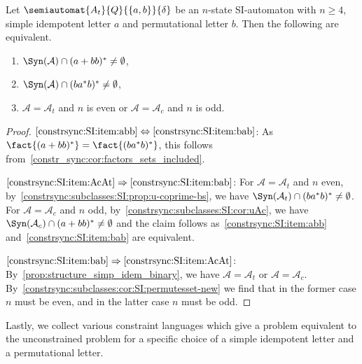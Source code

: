 \begin{corollary}
	\label{constrsync:subclasses:SI:abb} 	\label{constrsync:SI:base-cases}
	Let $\semiautomat{A_t}{Q}{\{a,b\}}{\delta}$ be an $n$-state SI-automaton
	with %
	$n \ge 4$,
	simple idempotent letter $a$
	and permutational letter $b$. 	Then the following are equivalent.
	\begin{enumerate}
	\item \label{constrsync:SI:item:abb} $\Syn(\mathcal A) \cap (a+bb)^* \ne \emptyset$,
		
	\item \label{constrsync:SI:item:bab} $\Syn(\mathcal A) \cap (ba^*b)^* \ne \emptyset$,
		
	\item \label{constrsync:SI:item:AcAt} $\mathcal A = \mathcal A_t$ and $n$ is even or $\mathcal A = \mathcal A_c$ and $n$ is odd.	
	\end{enumerate}
\end{corollary}
\begin{proof}
$\ref{constrsync:SI:item:abb} \Leftrightarrow \ref{constrsync:SI:item:bab}$:
As $\fact{(a+bb)^*} = \fact{(ba^*b)^*}$,
this follows from~\cref{constr_sync:cor:factors_sets_included}.

$\ref{constrsync:SI:item:AcAt} \Rightarrow \ref{constrsync:SI:item:bab}$:
	For $\mathcal A = \mathcal A_t$
	and $n$ even, by~\cref{constrsync:subclasses:SI:prop:u-coprime-bs},	
	we have $\Syn(\mathcal A_t) \cap (ba^*b)^* \ne \emptyset$.
	For $\mathcal A = \mathcal A_c$
	and $n$ odd, by~\cref{constrsync:subclasses:SI:cor:uAc},
	we have $\Syn(\mathcal A_c) \cap  (a+bb)^* \ne \emptyset$
	and the claim follows as~\ref{constrsync:SI:item:abb} 
	and~\ref{constrsync:SI:item:bab} are equivalent.
	
$\ref{constrsync:SI:item:bab} \Rightarrow \ref{constrsync:SI:item:AcAt}$:
	By~\cref{prop:structure_simp_idem_binary},
	we have $\mathcal A = \mathcal A_t$
	or $\mathcal A = \mathcal A_c$.
	By~\cref{constrsync:subclasses:cor:SI:permutesset-new} 
	we find that in the former case $n$ must be even,
	and in the latter case $n$ must be odd.		
\end{proof}

Lastly, we collect various constraint languages
which give a problem equivalent to the unconstrained
problem for a specific choice of a simple idempotent
letter and a permutational letter.

